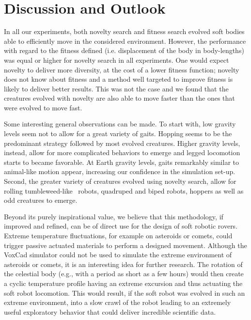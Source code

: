 \documentclass{sig-alternate}
\begin{document}
\section{Discussion and Outlook}
In all our experiments, both novelty search and fitness search evolved soft bodies able to efficiently move in the considered environment. However, the performance with regard to the fitness defined (i.e. displacement of the body in body-lengths) was equal or higher for novelty search in all experiments. One would expect novelty to deliver more diversity, at the cost of a lower fitness function; novelty does not know about fitness and a method well targeted to improve fitness is likely to deliver better results. This was not the case and we found that the creatures evolved with novelty are also able to move faster than the ones that were evolved to move fast.

Some interesting general observations can be made. To start with, low gravity levels seem not to allow for a great variety of gaits. Hopping seems to be the predominant strategy followed by most evolved creatures. Higher gravity levels, instead, allow for more complicated behaviors to emerge and legged locomotion starts to became favorable. At Earth gravity levels, gaits remarkably similar to animal-like motion appear, increasing our confidence in the simulation set-up. Second, the greater variety of creatures evolved using novelty search, allow for rolling tumbleweed-like~\cite{antol2003low} robots, quadruped and biped robots, hoppers as well as odd creatures to emerge. 

Beyond its purely inspirational value, we believe that this methodology, if improved and refined, can be of direct use for the design of soft robotic rovers. Extreme temperature fluctuations, for example on asteroids or comets, could trigger passive actuated materials to perform a designed movement. Although the VoxCad simulator could not be used to simulate the extreme environment of asteroids or comets, it is an interesting idea for further research. The rotation of the celestial body (e.g., with a period as short as a few hours) would then create a cyclic temperature profile having an extreme excursion and thus actuating the soft robot locomotion. This would result, if the soft robot was evolved in such an extreme environment, into a slow crawl of the robot leading to an extremely useful exploratory behavior that could deliver incredible scientific data. %
\end{document}
